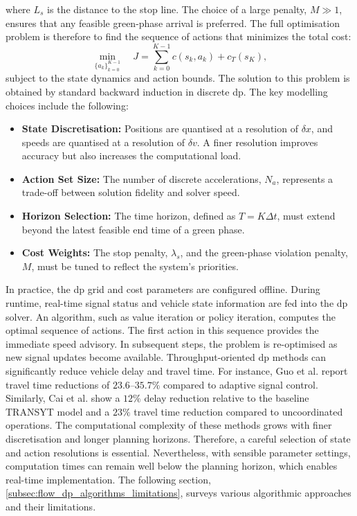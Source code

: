 where $L_s$ is the distance to the stop line. The choice of a large penalty, $M\gg1$, ensures that any feasible green-phase arrival is preferred.
\mynewline
The full optimisation problem is therefore to find the sequence of actions that minimizes the total cost:
\begin{equation}
    \min_{\{a_k\}_{k=0}^{K-1}} \quad J = \sum_{k=0}^{K-1} c(s_k,a_k) + c_T(s_K),
\end{equation}
subject to the state dynamics and action bounds. The solution to this problem is obtained by standard backward induction in discrete \ac{dp}.
\mynewline
The key modelling choices include the following:
\begin{itemize}
    \item \textbf{State Discretisation:} Positions are quantised at a resolution of $\delta x$, and speeds are quantised at a resolution of $\delta v$. A finer resolution improves accuracy but also increases the computational load.
    \item \textbf{Action Set Size:} The number of discrete accelerations, $N_a$, represents a trade-off between solution fidelity and solver speed.
    \item \textbf{Horizon Selection:} The time horizon, defined as $T=K\Delta t$, must extend beyond the latest feasible end time of a green phase.
    \item \textbf{Cost Weights:} The stop penalty, $\lambda_s$, and the green-phase violation penalty, $M$, must be tuned to reflect the system's priorities.
\end{itemize}
In practice, the \ac{dp} grid and cost parameters are configured offline. During runtime, real-time signal status and vehicle state information are fed into the \ac{dp} solver. An algorithm, such as value iteration or policy iteration, computes the optimal sequence of actions. The first action in this sequence provides the immediate speed advisory. In subsequent steps, the problem is re-optimised as new signal updates become available.
\mynewline
Throughput-oriented \ac{dp} methods can significantly reduce vehicle delay and travel time. For instance, Guo et al. \cite{Guo2019} report travel time reductions of $23.6$--$35.7\%$ compared to adaptive signal control. Similarly, Cai et al. \cite{Cai2008} show a $12\%$ delay reduction relative to the baseline TRANSYT model and a $23\%$ travel time reduction compared to uncoordinated operations. The computational complexity of these methods grows with finer discretisation and longer planning horizons. Therefore, a careful selection of state and action resolutions is essential. Nevertheless, with sensible parameter settings, computation times can remain well below the planning horizon, which enables real-time implementation. The following section, \vref{subsec:flow_dp_algorithms_limitations}, surveys various algorithmic approaches and their limitations.

